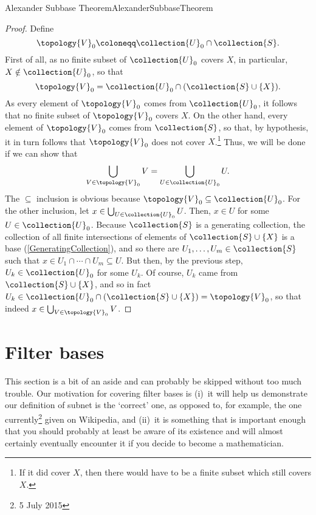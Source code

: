 \begin{thm}{Alexander Subbase Theorem}{AlexanderSubbaseTheorem}
\begin{proof}
Define
\begin{equation}
\topology{V}_0\coloneqq \collection{U}_0\cap \collection{S}.
\end{equation}
First of all, as no finite subset of $\collection{U}_0$ covers $X$, in particular, $X\notin \collection{U}_0$, so that
\begin{equation}
\topology{V}_0=\collection{U}_0\cap (\collection{S}\cup \{ X\} ).
\end{equation}
As every element of $\topology{V}_0$ comes from $\collection{U}_0$, it follows that no finite subset of $\topology{V}_0$ covers $X$.  On the other hand, every element of $\topology{V}_0$ comes from $\collection{S}$, so that, by hypothesis, it in turn follows that $\topology{V}_0$ does not cover $X$.\footnote{If it did cover $X$, then there would have to be a finite subset which still covers $X$.}  Thus, we will be done if we can show that
\begin{equation}
\bigcup _{V\in \topology{V}_0}V=\bigcup _{U\in \collection{U}_0}U.
\end{equation}
The $\subseteq$ inclusion is obvious because $\topology{V}_0\subseteq \collection{U}_0$.  For the other inclusion, let $x\in \bigcup _{U\in \collection{U}_0}U$.  Then, $x\in U$ for some $U\in \collection{U}_0$.  Because $\collection{S}$ is a generating collection, the collection of all finite intersections of elements of $\collection{S}\cup \{ X\}$ is a base (\cref{GeneratingCollection}), and so there are $U_1,\ldots ,U_m\in \collection{S}$ such that $x\in U_1\cap \cdots \cap U_m\subseteq U$.  But then, by the previous step, $U_k\in \collection{U}_0$ for some $U_k$.  Of course, $U_k$ came from $\collection{S}\cup \{ X\}$, and so in fact $U_k\in \collection{U}_0\cap (\collection{S}\cup \{ X\} )=\topology{V}_0$, so that indeed $x\in \bigcup _{V\in \topology{V}_0}V$.
\end{proof}
\end{thm}

\section{Filter bases}\label{sct4.4}

This section is a bit of an aside and can probably be skipped without too much trouble.  Our motivation for covering filter bases is (i)~it will help us demonstrate our definition of subnet is the `correct' one, as opposed to, for example, the one currently\footnote{5 July 2015} given on Wikipedia, and (ii)~it is something that is important enough that you should probably at least be aware of its existence and will almost certainly eventually encounter it if you decide to become a mathematician.

